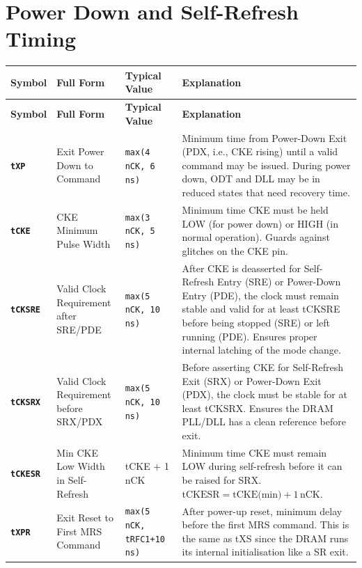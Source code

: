 \documentclass[11pt,a4paper]{article}
\newcommand{\sym}[1]{\texttt{\textbf{#1}}}
\begin{document}
\section{Power Down and Self-Refresh Timing}

\begin{longtable}{L{2.2cm} L{4.8cm} L{3.5cm} L{4cm}}
\toprule
\textbf{Symbol} & \textbf{Full Form} & \textbf{Typical Value} & \textbf{Explanation} \\
\midrule
\endfirsthead
\toprule
\textbf{Symbol} & \textbf{Full Form} & \textbf{Typical Value} & \textbf{Explanation} \\
\midrule
\endhead
\bottomrule
\endfoot

\sym{tXP} & Exit Power Down to Command & \texttt{max(4\,nCK, 6\,ns)} &
  Minimum time from Power-Down Exit (PDX, i.e., CKE rising) until a valid command may be issued.
  During power down, ODT and DLL may be in reduced states that need recovery time. \\

\sym{tCKE} & CKE Minimum Pulse Width & \texttt{max(3\,nCK, 5\,ns)} &
  Minimum time CKE must be held LOW (for power down) or HIGH (in normal operation).
  Guards against glitches on the CKE pin. \\

\sym{tCKSRE} & Valid Clock Requirement after SRE/PDE & \texttt{max(5\,nCK, 10\,ns)} &
  After CKE is deasserted for Self-Refresh Entry (SRE) or Power-Down Entry (PDE),
  the clock must remain stable and valid for at least tCKSRE before being stopped (SRE) 
  or left running (PDE). Ensures proper internal latching of the mode change. \\

\sym{tCKSRX} & Valid Clock Requirement before SRX/PDX & \texttt{max(5\,nCK, 10\,ns)} &
  Before asserting CKE for Self-Refresh Exit (SRX) or Power-Down Exit (PDX),
  the clock must be stable for at least tCKSRX. 
  Ensures the DRAM PLL/DLL has a clean reference before exit. \\

\sym{tCKESR} & Min CKE Low Width in Self-Refresh & tCKE + 1\,nCK &
  Minimum time CKE must remain LOW during self-refresh before it can be raised for SRX.
  $\text{tCKESR} = \text{tCKE(min)} + 1\,\text{nCK}$. \\

\sym{tXPR} & Exit Reset to First MRS Command & \texttt{max(5\,nCK, tRFC1+10\,ns)} &
  After power-up reset, minimum delay before the first MRS command.
  This is the same as tXS since the DRAM runs its internal initialisation like a SR exit. \\


\end{longtable}
\end{document}
